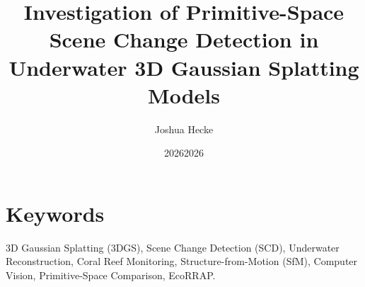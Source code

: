 \documentclass[final]{qutthesis}
\title{\LARGE Investigation of Primitive-Space Scene Change Detection in Underwater 3D Gaussian Splatting Models}
\author{Joshua Hecke}
\date{\large 2026}
\date{\large 2026}
\begin{document}
\frontmatter 
\pagestyle{myfancy}
\maketitle
\clearpage

\chapter{Keywords}
\normalfont
3D Gaussian Splatting (3DGS), Scene Change Detection (SCD), Underwater Reconstruction, Coral Reef Monitoring, Structure-from-Motion (SfM), Computer Vision, Primitive-Space Comparison, EcoRRAP.
\clearpage

\begingroup
\renewcommand{\baselinestretch}{0.8} %
\small                                %
\tableofcontents
\endgroup
\clearpage
\listoftables
\vspace{5cm}
\listoffigures

\mainmatter
\pagestyle{myfancy}


\vspace{1cm}

\newpage



\newpage

\newpage


\newpage

\newpage



\backmatter
\pagestyle{myfancy}
%


%
%
%
%



%
\end{document}
